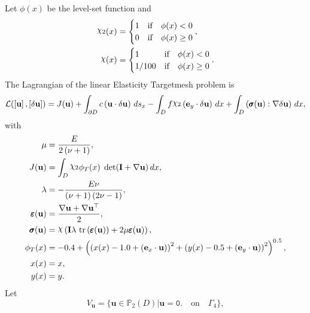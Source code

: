 \documentclass[preview]{standalone}
\let\oldcdot\cdot
\let\cdot\oldcdot
\begin{document}
Let $\phi(x)$ be the level-set function and
 \begin{align*}\raisebox{\depth}{$\chi_2$}(x) &= \begin{cases} 1 & \mbox{if}\quad \phi(x) < 0 \\ 0 & \mbox{if}\quad \phi(x)  \ge 0 \end{cases},\\
\raisebox{\depth}{$\chi$}(x) &= \begin{cases} 1 & \mbox{if}\quad \phi(x) < 0 \\ 1/100 & \mbox{if}\quad \phi(x)  \ge 0 \end{cases}.\end{align*}
The Lagrangian of the linear Elasticity Targetmesh problem is
\begin{dmath*}
\mathcal L(\left[ {\mathbf{ u }}\right],\left[ {\delta\mathbf{  u }}\right]) = J({\mathbf{ u }}) +  \int_{\partial D} c \left( {\mathbf{ u }} \cdot {\delta\mathbf{  u }} \right) \,ds_x -  \int_{D} f \raisebox{\depth}{$\chi_2$} \left( \mathbf e_y \cdot {\delta\mathbf{  u }} \right) \,dx +  \int_{D} \left( \pmb \sigma({\mathbf{ u }}) \mathrel{:}  \nabla {\delta\mathbf{  u }}  \right) \,dx , 
\end{dmath*}
with 
\begin{align*}
\mu &= \frac{E}{2 \left(\nu + 1\right)},\\
J({\mathbf{ u }}) &=  \int_{D} \raisebox{\depth}{$\chi_2$} \phi_{T}(x)  \;\operatorname{det}(\mathbf{I} +  \nabla {\mathbf{ u }} )  \,dx,\\
\lambda &= - \frac{E \nu}{\left(\nu + 1\right) \left(2 \nu - 1\right)},\\
\pmb \varepsilon({\mathbf{ u }}) &= \frac{ \nabla {\mathbf{ u }}  +   \nabla {\mathbf{ u }} ^\top }{2},\\
\pmb \sigma({\mathbf{ u }}) &= \raisebox{\depth}{$\chi$} \left(\mathbf{I} \lambda  \,\operatorname{tr}\left(\pmb \varepsilon({\mathbf{ u }})\right)  + 2 \mu \pmb \varepsilon({\mathbf{ u }})\right),\\
\phi_{T}(x) &= -0.4 + \left(\left(x(x) - 1.0 + \left( \mathbf e_x \cdot {\mathbf{ u }} \right)\right)^{2} + \left(y(x) - 0.5 + \left( \mathbf e_y \cdot {\mathbf{ u }} \right)\right)^{2}\right)^{0.5},\\
x(x) &= x,\\
y(x) &= y.
 \end{align*}
Let
\begin{equation*}
V_{{\mathbf{ u }}} = \{ {\mathbf{ u }} \in \mathbb P_{2}(D)| {\mathbf{ u }} = \mathtt{\text{0.}}  \quad \text{{on}} \quad\Gamma_{4} \},\end{equation*}
\end{document}

